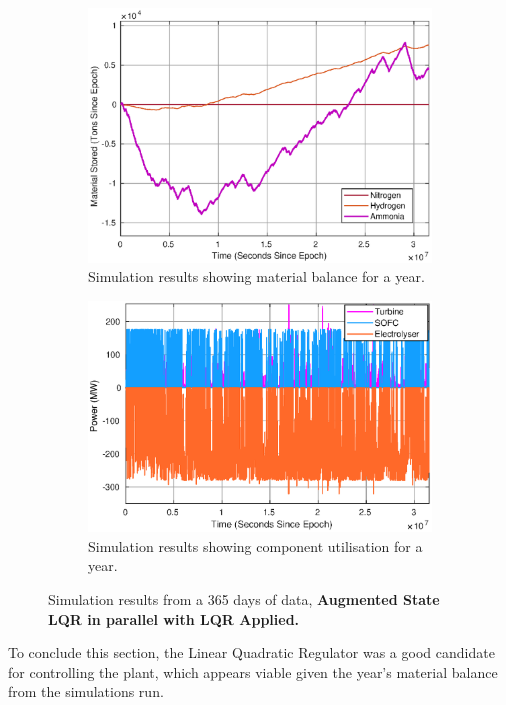 


\begin{figure}[ht]
\centering
\begin{subfigure}{.5\textwidth}
  \centering
  \includegraphics[width=1\linewidth]{images/results/tankyear.eps}
  \caption{Simulation results showing material balance for a year.}
  \label{fig:tankyear}
\end{subfigure}%
\begin{subfigure}{.5\textwidth}
  \centering
  \includegraphics[width=1\linewidth]{images/results/useyear.eps}
  \caption{Simulation results showing component utilisation for a year.}
  \label{fig:useyear}
\end{subfigure}
\caption{Simulation results from a 365 days of data, {\bf Augmented State LQR in parallel with LQR Applied.}}
\label{fig:materialyear}
\end{figure}

To conclude this section, the Linear Quadratic Regulator was a good candidate for controlling the plant, which appears viable given the year's material balance from the simulations run.